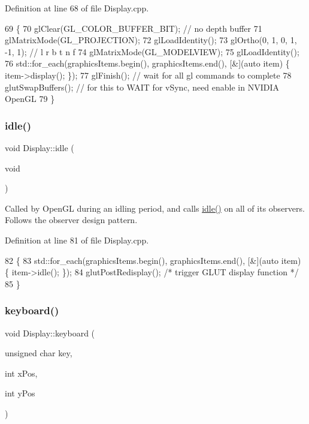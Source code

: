Definition at line 68 of file Display.\+cpp.


\begin{DoxyCode}
69 \{
70   glClear(GL\_COLOR\_BUFFER\_BIT); \textcolor{comment}{// no depth buffer}
71   glMatrixMode(GL\_PROJECTION);
72   glLoadIdentity();
73   glOrtho(0, 1, 0, 1, -1, 1);  \textcolor{comment}{// l r b t n f}
74   glMatrixMode(GL\_MODELVIEW);
75   glLoadIdentity();
76   std::for\_each(graphicsItems.begin(), graphicsItems.end(), [&](\textcolor{keyword}{auto} item) \{ item->display(); \});
77   glFinish();   \textcolor{comment}{// wait for all gl commands to complete}
78   glutSwapBuffers(); \textcolor{comment}{// for this to WAIT for vSync, need enable in NVIDIA OpenGL}
79 \}
\end{DoxyCode}
\mbox{\label{classDisplay_aee4bd8d62d2911a938523339630a4357}} 
\subsubsection{\texorpdfstring{idle()}{idle()}}
{\footnotesize\ttfamily void Display\+::idle (\begin{DoxyParamCaption}\item[{void}]{ }\end{DoxyParamCaption})\hspace{0.3cm}{\ttfamily [static]}}

Called by Open\+GL during an idling period, and calls \mbox{\hyperlink{classDisplay_aee4bd8d62d2911a938523339630a4357}{idle()}} on all of its observers. Follows the observer design pattern. 

Definition at line 81 of file Display.\+cpp.


\begin{DoxyCode}
82 \{
83   std::for\_each(graphicsItems.begin(), graphicsItems.end(), [&](\textcolor{keyword}{auto} item) \{ item->idle(); \});
84   glutPostRedisplay();  \textcolor{comment}{/* trigger GLUT display function */}
85 \}
\end{DoxyCode}
\mbox{\label{classDisplay_a534c28d5e7287ad3e98106a6d8105e68}} 
\subsubsection{\texorpdfstring{keyboard()}{keyboard()}}
{\footnotesize\ttfamily void Display\+::keyboard (\begin{DoxyParamCaption}\item[{unsigned char}]{key,  }\item[{int}]{x\+Pos,  }\item[{int}]{y\+Pos }\end{DoxyParamCaption})\hspace{0.3cm}{\ttfamily [static]}}

